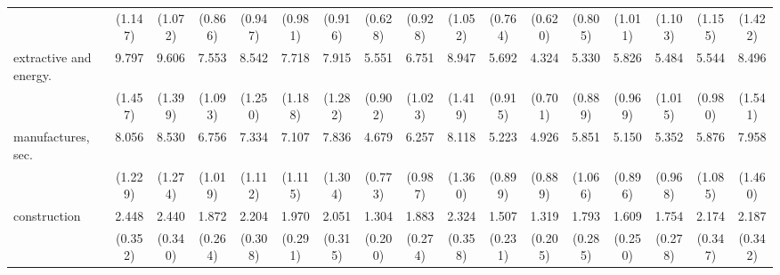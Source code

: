 {\begin{tabular}{l*{16}{c}}
                    &     (1.147)         &     (1.072)         &     (0.866)         &     (0.947)         &     (0.981)         &     (0.916)         &     (0.628)         &     (0.928)         &     (1.052)         &     (0.764)         &     (0.620)         &     (0.805)         &     (1.011)         &     (1.103)         &     (1.155)         &     (1.422)         \\
[1em]
extractive and energy.&       9.797\sym{***}&       9.606\sym{***}&       7.553\sym{***}&       8.542\sym{***}&       7.718\sym{***}&       7.915\sym{***}&       5.551\sym{***}&       6.751\sym{***}&       8.947\sym{***}&       5.692\sym{***}&       4.324\sym{***}&       5.330\sym{***}&       5.826\sym{***}&       5.484\sym{***}&       5.544\sym{***}&       8.496\sym{***}\\
                    &     (1.457)         &     (1.399)         &     (1.093)         &     (1.250)         &     (1.188)         &     (1.282)         &     (0.902)         &     (1.023)         &     (1.419)         &     (0.915)         &     (0.701)         &     (0.889)         &     (0.969)         &     (1.015)         &     (0.980)         &     (1.541)         \\
[1em]
manufactures, sec.  &       8.056\sym{***}&       8.530\sym{***}&       6.756\sym{***}&       7.334\sym{***}&       7.107\sym{***}&       7.836\sym{***}&       4.679\sym{***}&       6.257\sym{***}&       8.118\sym{***}&       5.223\sym{***}&       4.926\sym{***}&       5.851\sym{***}&       5.150\sym{***}&       5.352\sym{***}&       5.876\sym{***}&       7.958\sym{***}\\
                    &     (1.229)         &     (1.274)         &     (1.019)         &     (1.112)         &     (1.115)         &     (1.304)         &     (0.773)         &     (0.987)         &     (1.360)         &     (0.899)         &     (0.889)         &     (1.066)         &     (0.896)         &     (0.968)         &     (1.085)         &     (1.460)         \\
[1em]
construction        &       2.448\sym{***}&       2.440\sym{***}&       1.872\sym{***}&       2.204\sym{***}&       1.970\sym{***}&       2.051\sym{***}&       1.304         &       1.883\sym{***}&       2.324\sym{***}&       1.507\sym{**} &       1.319         &       1.793\sym{***}&       1.609\sym{**} &       1.754\sym{***}&       2.174\sym{***}&       2.187\sym{***}\\
                    &     (0.352)         &     (0.340)         &     (0.264)         &     (0.308)         &     (0.291)         &     (0.315)         &     (0.200)         &     (0.274)         &     (0.358)         &     (0.231)         &     (0.205)         &     (0.285)         &     (0.250)         &     (0.278)         &     (0.347)         &     (0.342)         \\

\end{tabular}}
